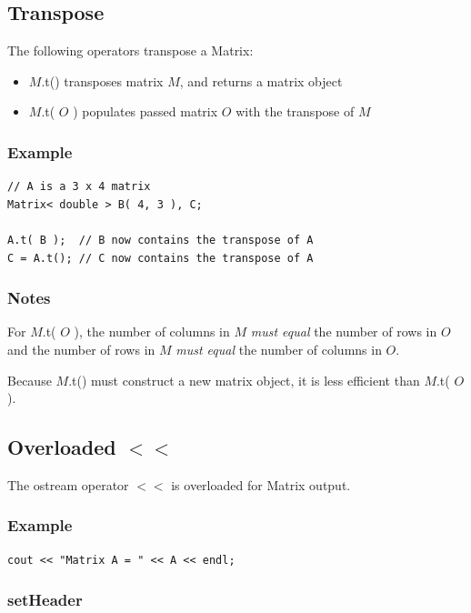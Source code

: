 \documentclass{report}
\begin{document}
\subsection{Transpose}

The following operators transpose a Matrix:

\begin{itemize}
\item $M$.t() transposes matrix $M$, and returns a matrix object
\item $M$.t( $O$ ) populates passed matrix $O$ with the transpose
      of $M$
\end{itemize}

\subsubsection{Example}

\begin{verbatim}
// A is a 3 x 4 matrix
Matrix< double > B( 4, 3 ), C;

A.t( B );  // B now contains the transpose of A
C = A.t(); // C now contains the transpose of A
\end{verbatim}

\subsubsection{Notes}

For $M$.t( $O$ ), the number of columns in $M$ {\em must equal} the
number of rows in $O$ and the number of rows in $M$ {\em must equal}
the number of columns in $O$.

Because $M$.t() must construct a new matrix object, it is less
efficient than $M$.t( $O$ ).

\subsection{Overloaded $<<$}

The ostream operator $<<$ is overloaded for Matrix output.

\subsubsection{Example}

\begin{verbatim}
cout << "Matrix A = " << A << endl;
\end{verbatim}

\subsubsection{setHeader}
\end{document}
